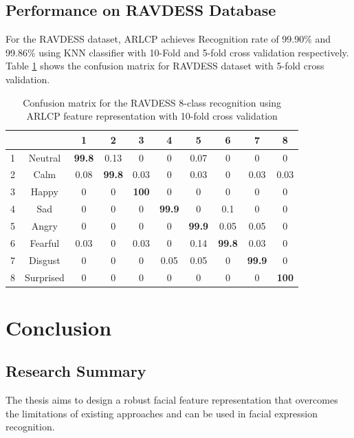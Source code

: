 \documentclass[12pt]{article}
\begin{document}
\subsection{Performance on RAVDESS Database}
For the RAVDESS dataset, ARLCP achieves Recognition rate of 99.90\% and 99.86\% using KNN classifier with 10-Fold and 5-fold cross validation respectively. Table \ref{tab:RAVDESS_confusion_matrix} shows the confusion matrix for RAVDESS dataset with 5-fold cross validation.

\begin{table}[H]
	\begin{center}
			\caption{Confusion matrix for the RAVDESS 8-class recognition using	ARLCP feature representation with 10-fold cross validation} 
		\begin{tabular}{|c|c|c|c|c|c|c|c|c|c|}
			
			\hline
			& & 1 & 2 & 3 & 4 & 5 & 6 & 7 & 8 \\
			\hline
			1 & Neutral & \textbf{99.8} & 0.13 &  0 & 0 & 0.07 &  0  & 0 & 0 \\
			\hline
			2 & Calm & 0.08 & \textbf{99.8} & 0.03 & 0 & 0.03 &  0  & 0.03 & 0.03  \\
			\hline
			3 & Happy & 0  & 0 & \textbf{100} & 0 & 0 &  0  & 0 & 0  \\
			\hline
			4 & Sad & 0  & 0  & 0 & \textbf{99.9} & 0 &  0.1  & 0 & 0  \\
			\hline
			5 & Angry & 0 & 0 & 0 & 0 & \textbf{99.9} & 0.05 & 0.05 & 0  \\
			\hline
			6 & Fearful & 0.03 & 0 & 0.03 & 0 &  0.14 & \textbf{99.8} & 0.03 & 0  \\
			\hline
			7 & Disgust & 0 & 0 & 0 & 0.05 &  0.05  & 0 & \textbf{99.9} & 0  \\
			\hline
			8 & Surprised & 0 & 0 & 0 & 0 & 0 &  0  & 0 & \textbf{100} \\
			\hline
			
			
		\end{tabular}
	
		\label{tab:RAVDESS_confusion_matrix}
	\end{center}
\end{table}


\newpage

\section{Conclusion}
\label{chap:ch3}

\subsection{Research Summary}
The thesis aims to design a robust facial feature representation that overcomes the limitations of existing approaches and can be used in facial expression recognition. 
\end{document}

